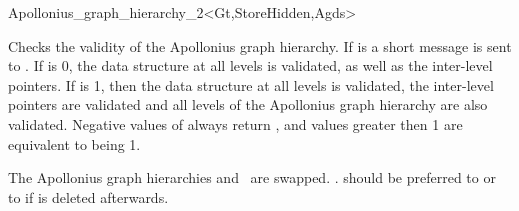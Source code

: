 \begin{ccRefClass}{Apollonius_graph_hierarchy_2<Gt,StoreHidden,Agds>}
\begin{ccAdvanced}
{Checks the validity of the Apollonius graph hierarchy. If
 is  a short message is sent to
. If  is 0, the data structure at all levels 
is validated, as well as the inter-level pointers. If  is
1, then the data structure at all levels is validated, the inter-level
pointers are validated and all levels of the Apollonius graph
hierarchy are also validated. Negative values of  always
return , and values greater then 1 are equivalent to
 being 1.}
\end{ccAdvanced}

%
\ccGlue
{The Apollonius graph hierarchies  and \ccVar\ are
swapped. \ccVar. should be preferred to \ccVar{} or to \ccVar{} if  is deleted afterwards.}


\ccSeeAlso
{}\\
\\
\\
\\
\\
\\



\end{ccRefClass}

